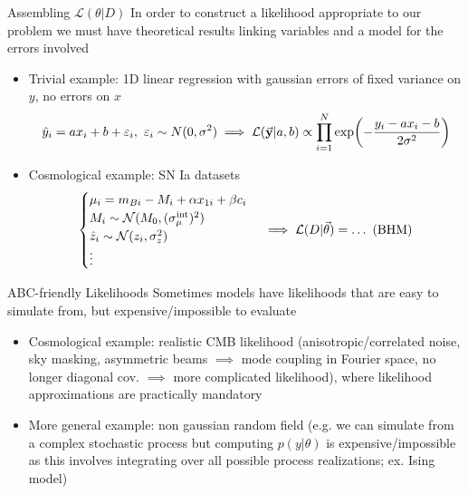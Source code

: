 \documentclass{beamer}
\theoremstyle{remark}
\renewcommand{\L}{\mathcal{L}}
\newcommand{\N}{\mathcal{N}}
\begin{document}
\begin{frame}{Assembling $\L(\theta|D)$}
In order to construct a likelihood appropriate to our problem we must have theoretical results linking variables and a model for the errors involved
\pause
\begin{itemize}[<+->]
    \item Trivial example: 1D linear regression with gaussian errors of fixed variance on $y$, no errors on $x$
    \begin{equation*}
        \hat{y}_i = ax_i + b + \varepsilon_i, \ \varepsilon_i \sim N(0, \sigma^2) \implies \L(\va{y}|a,b)\propto \prod_{i=1}^N\exp(-\frac{y_i - ax_i - b}{2\sigma^2})
    \end{equation*}
    \item Cosmological example: SN Ia datasets
    \begin{equation*}
    \begin{cases}
        \mu_i = m_{Bi}-M_i+\alpha x_{1i}+\beta c_i\\
        M_i\sim \N(M_0, (\sigma_\mu^{\text{int}})^2)\\
        \hat{z}_i \sim \N(z_i,\sigma_z^2)\\
        \vdots
    \end{cases}
    \implies \L(D|\va{\theta}) = \dots \ (\text{BHM})
    \end{equation*}
\end{itemize}
\end{frame}


\begin{frame}{ABC-friendly Likelihoods}
Sometimes models have likelihoods that are easy to simulate from, but expensive/impossible to evaluate
\pause
\begin{itemize}[<+->]
    \item Cosmological example: realistic CMB likelihood (anisotropic/correlated noise, sky masking, asymmetric beams $\implies$ mode coupling in Fourier space, no longer diagonal cov. $\implies$ more complicated likelihood), where likelihood approximations are practically mandatory
    \item More general example: non gaussian random field (e.g. we can simulate from a complex stochastic process but computing $p(y|\theta)$ is expensive/impossible as this involves integrating over all possible process realizations; ex. Ising model)
\end{itemize}

\end{frame}
\end{document}
